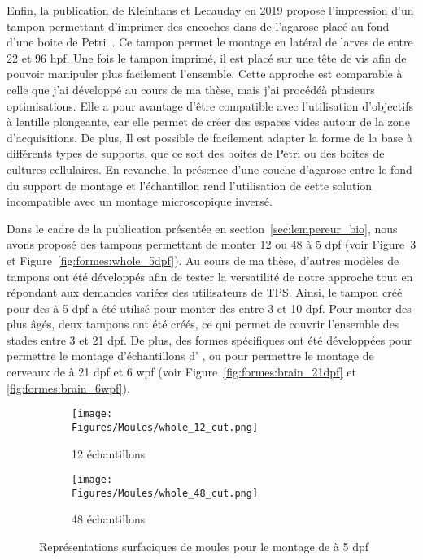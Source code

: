 \documentclass[\main/main.tex]{subfiles}
\begin{document}
Enfin, la publication de Kleinhans et Lecauday en 2019 propose l'impression d'un tampon permettant d'imprimer des encoches dans de l'agarose placé au fond d'une boite de Petri~\cite{kleinhans_2019}.
%
Ce tampon permet le montage en latéral de larves de \pz entre 22 et 96 hpf.
%
Une fois le tampon imprimé, il est placé sur une tête de vis afin de pouvoir manipuler plus facilement l'ensemble.
%
Cette approche est comparable à celle que j'ai développé au cours de ma thèse, mais j'ai procédéà plusieurs optimisations.
%
Elle a pour avantage d'être compatible avec l'utilisation d'objectifs à lentille plongeante, car elle permet de créer des espaces vides autour de la zone d'acquisitions.
%
De plus, Il est possible de facilement adapter la forme de la base à différents types de supports, que ce soit des boites de Petri ou des boites de cultures cellulaires.
%
En revanche, la présence d'une couche d'agarose entre le fond du support de montage et l'échantillon rend l'utilisation de cette solution incompatible avec un montage microscopique inversé.

% 
Dans le cadre de la publication présentée en section~\ref{sec:lempereur_bio},
nous avons proposé des tampons permettant de monter 12 ou 48 \pzs{} à 5 dpf 
(voir Figure~\ref{fig:tampon} et Figure~\ref{fig:formes:whole_5dpf}).
%
Au cours de ma thèse, d'autres modèles de tampons ont été développés afin de tester la versatilité de notre approche tout en répondant aux demandes variées des utilisateurs de TPS.
%
Ainsi, le tampon créé pour des \pzs{} à 5 dpf a été utilisé pour monter des \pzs{} entre 3 et 10 dpf.
%
Pour monter des \pzs{} plus âgés, deux tampons ont été créés, ce qui permet de
couvrir l'ensemble des stades entre 3 et 21 dpf.
%
De plus, des formes spécifiques ont été développées pour permettre le montage d'échantillons
d' \ol{}, ou pour permettre le montage de cerveaux de \pz{} à 21 dpf et 6 wpf
(voir Figure~\ref{fig:formes:brain_21dpf} et \ref{fig:formes:brain_6wpf}).

\begin{figure}[htbp]
    \centering
    \begin{subfigure}[b]{0.57\textwidth}
       \caption{
            \label{fig:tampon:12}
            12 échantillons
            }
       \centering \texttt{[image: \\Figures/Moules/whole\_12\_cut.png]}
    \end{subfigure}
    \begin{subfigure}[b]{0.38\textwidth}
       \caption{
        \label{fig:tampon:48}
        48 échantillons
        }
       \centering \texttt{[image: \\Figures/Moules/whole\_48\_cut.png]}
    \end{subfigure}
    \caption{
        \label{fig:tampon}
        Représentations surfaciques de moules pour le montage de \pzs{} à 5 dpf
    }
    
\end{figure}
\end{document}
